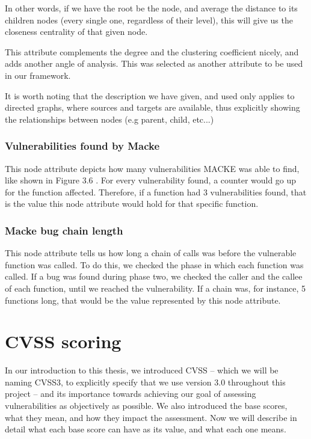 In other words, if we have the root be the node, and average the distance to its children nodes (every single one, regardless of their level), this will give us the closeness centrality of that given node.

This attribute complements the degree and the clustering coefficient nicely, and adds another angle of analysis. This was selected as another attribute to be used in our framework.

It is worth noting that the description we have given, and used only applies to directed graphs, where sources and targets are available, thus explicitly showing the relationships between nodes (e.g parent, child, etc...)

\subsubsection{Vulnerabilities found by Macke}

This node attribute depicts how many vulnerabilities MACKE was able to find, like shown in Figure 3.6 . For every vulnerability found, a counter would go up for the function affected. Therefore, if a function had 3 vulnerabilities found, that is the value this node attribute would hold for that specific function.

\subsubsection{Macke bug chain length}

This node attribute tells us how long a chain of calls was before the vulnerable function was called. To do this, we checked the phase in which each function was called. If a bug was found during phase two, we checked the caller and the callee of each function, until we reached the vulnerability. If a chain was, for instance, 5 functions long, that would be the value represented by this node attribute.

\section{CVSS scoring}

In our introduction to this thesis, we introduced CVSS -- which we will be naming CVSS3, to explicitly specify that we use version 3.0 throughout this project -- and its importance towards achieving our goal of assessing vulnerabilities as objectively as possible. We also introduced the base scores, what they mean, and how they impact the assessment. Now we will describe in detail what each base score can have as its value, and what each one means.

